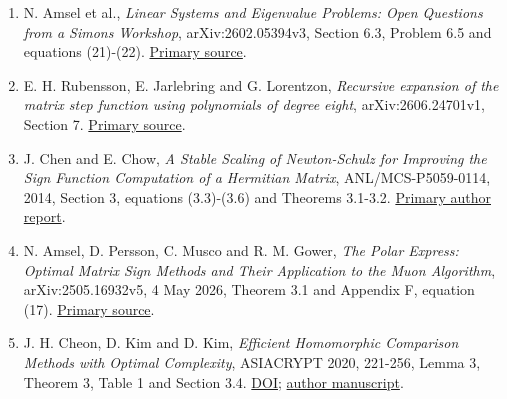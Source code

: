 \documentclass[10pt,a4paper]{article}
\providecommand{\tightlist}{\setlength{\itemsep}{0pt}\setlength{\parskip}{0pt}}
\begin{document}
\begin{enumerate}
\def\labelenumi{\arabic{enumi}.}
\tightlist
\item
  N. Amsel et al., \emph{Linear Systems and Eigenvalue Problems: Open
  Questions from a Simons Workshop}, arXiv:2602.05394v3, Section 6.3,
  Problem 6.5 and equations (21)-(22).
  \href{https://arxiv.org/html/2602.05394v3\#S6.SS3}{Primary source}.
\item
  E. H. Rubensson, E. Jarlebring and G. Lorentzon, \emph{Recursive
  expansion of the matrix step function using polynomials of degree
  eight}, arXiv:2606.24701v1, Section 7.
  \href{https://arxiv.org/html/2606.24701v1}{Primary source}.
\item
  J. Chen and E. Chow, \emph{A Stable Scaling of Newton-Schulz for
  Improving the Sign Function Computation of a Hermitian Matrix},
  ANL/MCS-P5059-0114, 2014, Section 3, equations (3.3)-(3.6) and
  Theorems 3.1-3.2.
  \href{https://www.mcs.anl.gov/papers/P5059-0114.pdf}{Primary author
  report}.
\item
  N. Amsel, D. Persson, C. Musco and R. M. Gower, \emph{The Polar
  Express: Optimal Matrix Sign Methods and Their Application to the Muon
  Algorithm}, arXiv:2505.16932v5, 4 May 2026, Theorem 3.1 and Appendix
  F, equation (17). \href{https://arxiv.org/html/2505.16932v5}{Primary
  source}.
\item
  J. H. Cheon, D. Kim and D. Kim, \emph{Efficient Homomorphic Comparison
  Methods with Optimal Complexity}, ASIACRYPT 2020, 221-256, Lemma 3,
  Theorem 3, Table 1 and Section 3.4.
  \href{https://doi.org/10.1007/978-3-030-64834-3_8}{DOI};
  \href{https://eprint.iacr.org/2019/1234.pdf}{author manuscript}.
\end{enumerate}
\end{document}
